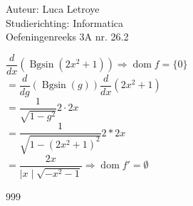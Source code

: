 \documentclass[a4paper]{article}
\newcommand{\ddx}{\dfrac{d}{dx}}
\newcommand{\ddg}{\dfrac{d}{dg}}
\begin{document}
  
\noindent \large Auteur: Luca Letroye \\
\noindent \large Studierichting: Informatica\\
\noindent \large Oefeningenreeks 3A nr. 26.2\\

\medskip


\normalsize

$\ddx \left(\operatorname{Bgsin}{(2x^2+1)}\right) \Rightarrow \operatorname{dom}f = \{0\} $ \\

$ = \ddg(\operatorname{Bgsin}{(g)}) \ddx(2x^2+1)$\\

$= \dfrac{1}{\sqrt{1-g^2}}2\cdot 2x$\\

$= \dfrac{1}{\sqrt{1-(2x^2+1)^2}}2*2x$\\

$= \dfrac{2x}{{\mid x \mid \sqrt{-x^2-1}}} \Rightarrow \operatorname{dom}f' = \emptyset$\\




\begin{thebibliography}{999}
\end{thebibliography}
\end{document}
